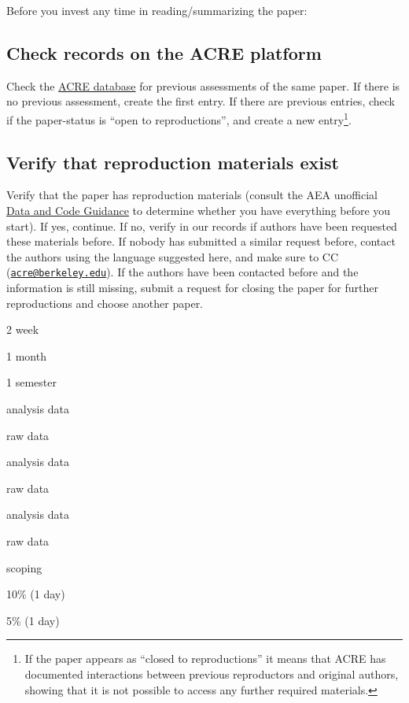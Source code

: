 \documentclass[]{book}
\begin{document}
Before you invest any time in reading/summarizing the paper:

\hypertarget{check-acre}{%
\subsection{Check records on the ACRE platform}\label{check-acre}}

Check the \href{ADD\%20LINK}{ACRE database} for previous assessments of the same paper. If there is no previous assessment, create the first entry. If there are previous entries, check if the paper-status is ``open to reproductions'', and create a new entry\footnote{If the paper appears as ``closed to reproductions'' it means that ACRE has documented interactions between previous reproductors and original authors, showing that it is not possible to access any further required materials. }.

\hypertarget{verify-rep-mat}{%
\subsection{Verify that reproduction materials exist}\label{verify-rep-mat}}

Verify that the paper has reproduction materials (consult the AEA unofficial \href{https://social-science-data-editors.github.io/guidance/Verification_guidance.html}{Data and Code Guidance} to determine whether you have everything before you start). If yes, continue. If no, verify in our records if authors have been requested these materials before. If nobody has submitted a similar request before, contact the authors using the language suggested here, and make sure to CC (\href{mailto:acre@berkeley.edu}{\nolinkurl{acre@berkeley.edu}}). If the authors have been contacted before and the information is still missing, submit a request for closing the paper for further reproductions and choose another paper.

2 week

1 month

1 semester

analysis data

raw data

analysis data

raw data

analysis data

raw data

scoping

10\% (1 day)

5\% (1 day)
\end{document}
